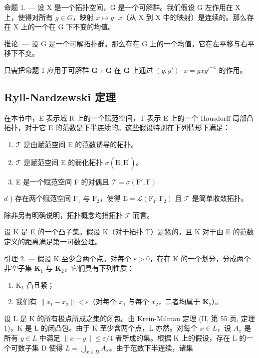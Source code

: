 命题 1. --- 设 X 是一个拓扑空间，G 是一个可解群。我们假设 G 左作用在 X 上，使得对所有 \(g \in G\)，映射 \(x \mapsto g \cdot x\)（从 X 到 X 中的映射）是连续的。那么存在 X 上的一个在 G 下不变的均值。

推论. --- 设 G 是一个可解拓扑群。那么存在 G 上的一个均值，它在左平移与右平移下不变。

只需把命题 1 应用于可解群 \(\mathbf{G} \times \mathbf{G}\) 在 \(\mathbf{G}\) 上通过 \((g, g') \cdot x = gxg'^{-1}\) 的作用。

\subsection{Ryll-Nardzewski 定理}

在本节中，E 表示域 R 上的一个赋范空间，T 表示 E 上的一个 Hausdorff 局部凸拓扑，对于它 E 的范数是下半连续的。这些假设特别在下列情形下满足：

\begin{enumerate}
\def\labelenumi{\alph{enumi})}
\item
  \(\mathcal{T}\) 是由赋范空间 E 的范数诱导的拓扑。
\item
  \(\mathcal{T}\) 是赋范空间 E 的弱化拓扑 \(\sigma (\mathrm{E},\mathrm{E}^{\prime})\)。
\item
  E 是一个赋范空间 F 的对偶且 \(\mathcal{T} = \sigma (\mathrm{F}',\mathrm{F})\)
\end{enumerate}

\(d\) ) 存在两个赋范空间 \(\mathrm{F}_1\) 与 \(\mathrm{F}_2\)，使得 \(\mathrm{E} = \mathcal{L}(\mathrm{F}_1;\mathrm{F}_2)\) 且 \(\mathcal{T}\) 是简单收敛拓扑。

除非另有明确说明，拓扑概念均指拓扑 \(\mathcal{T}\) 而言。

设 K 是 E 的一个凸子集。假设 K（对于拓扑 T）是紧的，且 K 对于由 E 的范数定义的距离满足第一可数公理。

引理 2. --- 假设 K 至少含两个点。对每个 \(\varepsilon > 0\)，存在 K 的一个划分，分成两个非空子集 \(\mathbf{K}_1\) 与 \(\mathbf{K}_2\)，它们具有下列性质：

\begin{enumerate}
\def\labelenumi{\alph{enumi})}
\item
  \(\mathrm{K}_1\) 凸且紧；
\item
  我们有 \(\| x_1 - x_2\| < \varepsilon\)（对每个 \(x_{1}\) 与每个 \(x_{2}\)，二者均属于 \(\mathbf{K}_2\)）。
\end{enumerate}

设 L 是 K 的所有极点所成之集的闭包。由 Krein-Milman 定理 (II, 第 55 页, 定理 1)，K 是 L 的闭凸包。由于 K 至少含两个点，L 亦然。对每个 \(x \in L\)，设 \(A_{x}\) 是所有 \(y \in L\) 中满足 \(\|x - y\| \leqslant \varepsilon/4\) 者所成的集。根据 K 上的假设，存在 L 的一个可数子集 D 使得 \(L = \bigcup_{x \in D} A_{x}\)。由于范数下半连续，诸集

